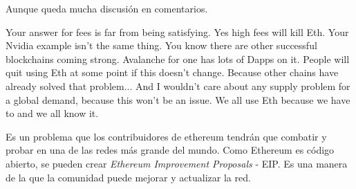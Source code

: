 Aunque queda mucha discusión en comentarios.
\begin{displayquote}
    Your answer for fees is far from being satisfying. Yes high fees will kill Eth. Your Nvidia example isn't the same thing.
    You know there are other successful blockchains coming strong. Avalanche for one has lots of Dapps on it. People will quit using Eth at some point if this doesn't change. Because other chains have already solved that problem...
    And I wouldn't care about any supply problem for a global demand, because this won't be an issue. We all use Eth because we have to and we all know it.
    \cite{web:reddit_ethereum_comment}
\end{displayquote}
Es un problema que los contribuidores de ethereum tendrán que combatir y probar en una de las redes más grande del mundo. Como Ethereum es código abierto, se pueden crear \textit{Ethereum Improvement Proposals} - EIP\cite{web:EIP}. Es una manera de la que la comunidad puede mejorar y actualizar la red.
